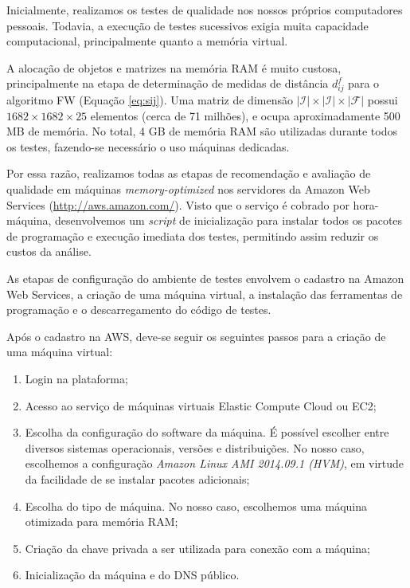 Inicialmente, realizamos os testes de qualidade nos nossos próprios computadores pessoais. Todavia, a execução de testes sucessivos exigia muita capacidade computacional, principalmente quanto a memória virtual.

A alocação de objetos e matrizes na memória RAM é muito custosa, principalmente na etapa de determinação de medidas de distância $d_{ij}^f$ para o algoritmo FW (Equação \ref{eq:sij}). Uma matriz de dimensão $\left|\mathcal{I}\right| \times\left|\mathcal{I}\right| \times\left|\mathcal{F}\right|$ possui $1682 \times 1682 \times 25$ elementos (cerca de 71 milhões), e ocupa aproximadamente 500 MB de memória. No total, 4 GB de memória RAM são utilizadas durante todos os testes, fazendo-se necessário o uso máquinas dedicadas.

Por essa razão, realizamos todas as etapas de recomendação e avaliação de qualidade em máquinas \textit{memory-optimized} nos servidores da Amazon Web Services (\url{http://aws.amazon.com/}). Visto que o serviço é cobrado por hora-máquina, desenvolvemos um \textit{script} de inicialização para instalar todos os pacotes de programação e execução imediata dos testes, permitindo assim reduzir os custos da análise.   

As etapas de configuração do ambiente de testes envolvem o cadastro na Amazon Web Services, a criação de uma máquina virtual, a instalação das ferramentas de programação e o descarregamento do código de testes.

Após o cadastro na AWS, deve-se seguir os seguintes passos para a criação de uma máquina virtual:

\begin{enumerate}
\item Login na plataforma; %
\item Acesso ao serviço de máquinas virtuais Elastic Compute Cloud ou EC2;%
\item Escolha da configuração do software da máquina. É possível escolher entre diversos sistemas operacionais, versões e distribuições. No nosso caso, escolhemos a configuração \textit{Amazon Linux AMI 2014.09.1 (HVM)}, em virtude da facilidade de se instalar pacotes adicionais;
\item Escolha do tipo de máquina. No nosso caso, escolhemos uma máquina otimizada para memória RAM;
\item Criação da chave privada a ser utilizada para conexão com a máquina;
\item Inicialização da máquina e do DNS público.
\end{enumerate}

